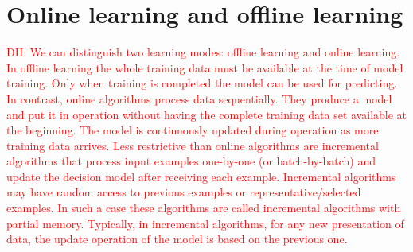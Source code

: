 \documentclass{article}
\newcommand\dhawat[1]{\textcolor{red}{DH: #1}}
\begin{document}
\section{Online learning and offline learning}
\dhawat{We can distinguish two learning modes: offline learning and online learning.
    In offline learning the whole training data must be available at the time of model training.
    Only when training is completed the model can be used for predicting. In contrast, online algorithms process data sequentially. They produce a model and put it in operation without having the complete training data set available at the beginning.
    The model is continuously updated during operation as more training data arrives.
    Less restrictive than online algorithms are incremental algorithms that process input examples one-by-one (or batch-by-batch) and update the decision model after receiving each example.
    Incremental algorithms may have random access to previous examples or representative/selected examples.
    In such a case these algorithms are called incremental algorithms with partial memory.
    Typically, in incremental algorithms, for any new presentation of data, the update operation of the model is based on the previous one.}
\end{document}
